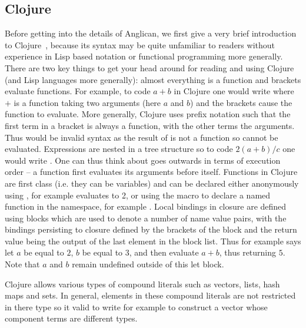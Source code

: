 \subsection{Clojure}
\label{sec:probprog:anglican:clojure} 

Before getting into the details of Anglican, we first give a very brief introduction to Clojure~\citep{hickey2008clojure},
because its syntax may be quite unfamiliar to readers without experience in Lisp based notation or functional programming
more generally.  There are two key things to get your head around for reading and using Clojure (and Lisp languages more
generally): almost everything is a function and brackets evaluate functions.  For example, to code $a+b$ in Clojure one
would write {\small {}} where $+$ is a function taking two arguments (here $a$ and $b$) and the brackets cause the
function to evaluate.  More generally, Clojure uses prefix notation such that 
the first term in a bracket is always a function, with the other terms the arguments.
Thus {\small {}} would be invalid syntax as the result of {\small {}}  is not a function so cannot be evaluated.
Expressions are nested in a tree structure so to code $2(a+b)/c$ one would write {\small {}} .  One can
thus think about goes outwards in terms of execution order -- a function first evaluates its arguments before
itself.  Functions in Clojure are first class (i.e. they can be variables) and can be declared either anonymously using
{\small {}}, for example {\small {}} evaluates to 2, or using the
macro  to declare a named function in the namespace, for example {\small {}}.
Local bindings in closure are defined using \cllet blocks which are used to denote a number of name value
pairs, with the bindings persisting to closure defined by the brackets of the \cllet block and the return value
being the output of the last element in the \cllet block list.  Thus for example
{\small {}} says let $a$ be equal to $2$, $b$ be equal to $3$, and then evaluate $a+b$, thus
returning $5$.  Note that $a$ and $b$ remain undefined outside of this let block.  

Clojure allows various types of compound literals such as vectors, lists, hash maps and sets.
In general, elements in these compound literals are not restricted in
there type so it valid to write for example {\small \lsi{[1 "2" (fn [x] (inc x))]}} to construct a vector 
whose component terms are different types.

